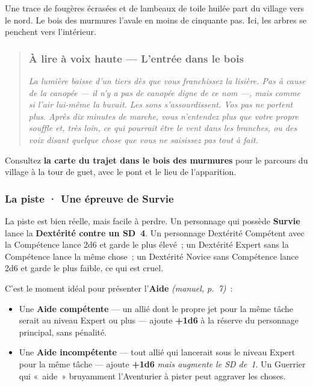 \documentclass[10pt,a4paper]{article}
\newcommand{\tightlist}{\setlength{\itemsep}{0pt}\setlength{\parskip}{0pt}}
\begin{document}
Une trace de fougères écrasées et de lambeaux de toile huilée part du village vers le nord. Le bois des murmures l’avale en moins de cinquante pas. Ici, les arbres se penchent vers l’intérieur.

\begin{quote}
\subsubsection{À lire à voix haute --- L’entrée dans le bois}\label{uxe0-lire-entrer-dans-les-bois}

\emph{La lumière baisse d’un tiers dès que vous franchissez la lisière. Pas à cause de la canopée --- il n’y a pas de canopée digne de ce nom ---, mais comme si l’air lui-même la buvait. Les sons s’assourdissent. Vos pas ne portent plus. Après dix minutes de marche, vous n’entendez plus que votre propre souffle et, très loin, ce qui pourrait être le vent dans les branches, ou des voix disant quelque chose que vous ne saisissez pas tout à fait.}
\end{quote}

Consultez \textbf{la carte du trajet dans le bois des murmures} pour le parcours du village à la tour de guet, avec le pont et le lieu de l’apparition.

\subsubsection{La piste · Une épreuve de Survie}\label{la-piste-uxe9preuve-de-survie}

La piste est bien réelle, mais facile à perdre. Un personnage qui possède \textbf{Survie} lance la \textbf{Dextérité contre un SD~4}. Un personnage Dextérité Compétent avec la Compétence lance 2d6 et garde le plus élevé~; un Dextérité Expert sans la Compétence lance la même chose~; un Dextérité Novice sans Compétence lance 2d6 et garde le plus faible, ce qui est cruel.

C’est le moment idéal pour présenter l’\textbf{Aide} \emph{(manuel, p.~7)}~:

\begin{itemize}
\tightlist
\item
  Une \textbf{Aide compétente} --- un allié dont le propre jet pour la même tâche serait au niveau Expert ou plus --- ajoute \textbf{+1d6} à la réserve du personnage principal, sans pénalité.
\item
  Une \textbf{Aide incompétente} --- tout allié qui lancerait sous le niveau Expert pour la même tâche --- ajoute \textbf{+1d6} \emph{mais augmente le SD de~1}. Un Guerrier qui «~aide~» bruyamment l’Aventurier à pister peut aggraver les choses.
\end{itemize}
\end{document}

